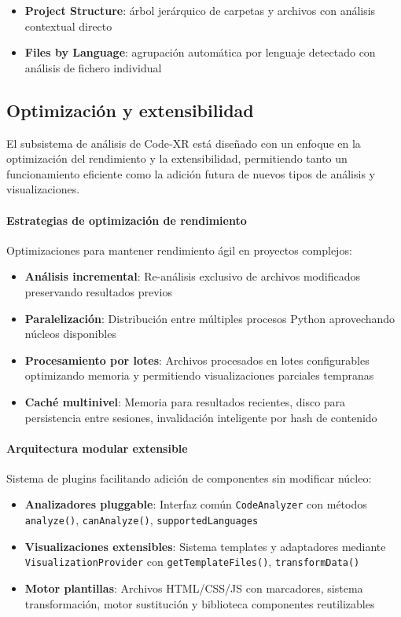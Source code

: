 \documentclass[a4paper, 12pt]{book}
\begin{document}
\begin{itemize}
  \item \textbf{Project Structure}: árbol jerárquico de carpetas y archivos con análisis contextual directo
  \item \textbf{Files by Language}: agrupación automática por lenguaje detectado con análisis de fichero individual
\end{itemize}

\subsection{Optimización y extensibilidad}
\label{sec:optimizacion-extensibilidad}

El subsistema de análisis de Code-XR está diseñado con un enfoque en la optimización del rendimiento y la extensibilidad, permitiendo tanto un funcionamiento eficiente como la adición futura de nuevos tipos de análisis y visualizaciones.

\paragraph{Estrategias de optimización de rendimiento}
Optimizaciones para mantener rendimiento ágil en proyectos complejos:

\begin{itemize}
  \item \textbf{Análisis incremental}: Re-análisis exclusivo de archivos modificados preservando resultados previos
  \item \textbf{Paralelización}: Distribución entre múltiples procesos Python aprovechando núcleos disponibles
  \item \textbf{Procesamiento por lotes}: Archivos procesados en lotes configurables optimizando memoria y permitiendo visualizaciones parciales tempranas
  \item \textbf{Caché multinivel}: Memoria para resultados recientes, disco para persistencia entre sesiones, invalidación inteligente por hash de contenido
\end{itemize}

\paragraph{Arquitectura modular extensible}
Sistema de plugins facilitando adición de componentes sin modificar núcleo:

\begin{itemize}
  \item \textbf{Analizadores pluggable}: Interfaz común \texttt{CodeAnalyzer} con métodos \texttt{analyze()}, \texttt{canAnalyze()}, \texttt{supportedLanguages}
  \item \textbf{Visualizaciones extensibles}: Sistema templates y adaptadores mediante \texttt{VisualizationProvider} con \texttt{getTemplateFiles()}, \texttt{transformData()}
  \item \textbf{Motor plantillas}: Archivos HTML/CSS/JS con marcadores, sistema transformación, motor sustitución y biblioteca componentes reutilizables
\end{itemize}
\end{document}
